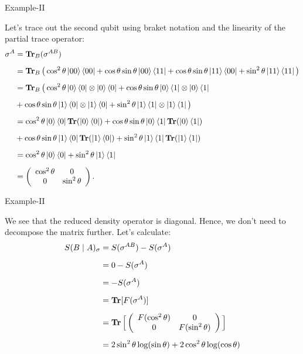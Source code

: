 \documentclass{beamer}
\begin{document}
\begin{frame}{Example-II}
\begin{scriptsize}
Let's trace out the second qubit using braket notation and the linearity of the partial trace operator: 
\begin{align}
\sigma^A &= \operatorname{\textup{\textbf{Tr}}}_B (\sigma^{AB}) \nonumber \\[0.5em]
&= \operatorname{\textup{\textbf{Tr}}}_B \big( \cos^2 \theta \ket{00} \bra{00}+ \cos \theta \sin\theta \ket{00} \bra{11} + \cos \theta \sin \theta \ket{11} \bra{00} + \sin^2 \theta \ket{11} \bra{11} \big) \nonumber \\[0.5em]
&= \operatorname{\textup{\textbf{Tr}}}_B \big(\cos^2 \theta \ket{0} \bra{0} \otimes \ket{0} \bra{0} + \cos \theta \sin\theta \ket{0} \bra{1} \otimes \ket{0} \bra{1} \nonumber \\[0.5em] &+ \cos \theta \sin\theta \ket{1} \bra{0} \otimes \ket{1} \bra{0} +\sin^2 \theta \ket{1} \bra{1} \otimes \ket{1} \bra{1} 
\big) \nonumber \\[0.5em]
&=
\cos^2 \theta \ket{0} \bra{0} \operatorname{\textup{\textbf{Tr}}} (\ket{0} \bra{0}) + \cos \theta \sin \theta \ket{0} \bra{1} \operatorname{\textup{\textbf{Tr}}} ( \ket{0} \bra{1}) \nonumber \\[0.5em] &+ \cos \theta \sin\theta \ket{1} \bra{0} \operatorname{\textup{\textbf{Tr}}} ( \ket{1} \bra{0} ) + \sin^2 \theta \ket{1} \bra{1} \operatorname{\textup{\textbf{Tr}}}( \ket{1} \bra{1} )
\nonumber \\[0.5em]
&= \cos^2 \theta \ket{0} \bra{0}
+\sin^2 \theta \ket{1} \bra{1}
\nonumber \\[0.5em] &=
\left( \begin{array}{cccc}
 \cos^2 \theta & 0  \\
 0 & \sin^2 \theta  \\
\end{array}
\right). \nonumber
\end{align}
\end{scriptsize}
\end{frame}

\begin{frame}{Example-II}
\begin{scriptsize}
We see that the reduced density operator is diagonal. Hence, we don't need to decompose the matrix further. Let's calculate:
\begin{align}
S(B \mid A)_{\sigma}&=S(\sigma^{AB})-S(\sigma^A)
\nonumber \\[0.5em] &=0-S(\sigma^A) \nonumber \\[0.5em]
&=-S(\sigma^A) \nonumber \\[0.5em]
&=\operatorname{\textup{\textbf{Tr}}}[F(\sigma^{A})] \nonumber \\[0.5em]
&= \operatorname{\textup{\textbf{Tr}}} \Big[
\left( \begin{array}{cccc}
 F(\cos^2 \theta) & 0  \\
 0 & F(\sin^2 \theta)  \\
\end{array}
\right)
\Big]
\nonumber \\[0.5em]
&= 
2 \sin ^2 \theta  \log (\sin \theta )+2 \cos ^2 \theta  \log (\cos \theta ) \nonumber
\end{align}
\end{scriptsize}
\end{frame}
\end{document}
